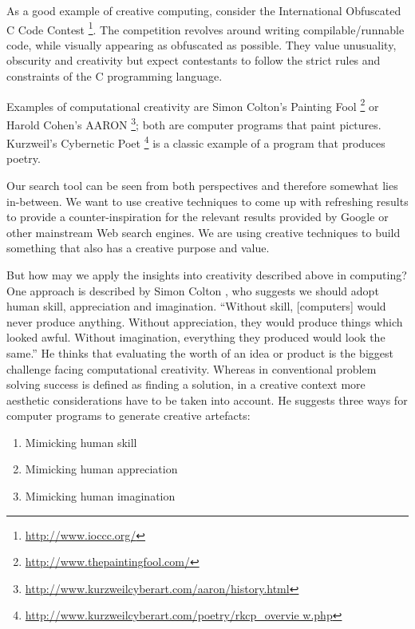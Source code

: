 As a good example of creative computing, consider the International Obfuscated C Code Contest \footnote{\url{http://www.ioccc.org/}}. The competition revolves around writing compilable/runnable code, while visually appearing as obfuscated as possible. They value unusuality, obscurity and creativity but expect contestants to follow the strict rules and constraints of the C programming language.

Examples of computational creativity are Simon Colton's Painting Fool \footnote{\url{http://www.thepaintingfool.com/}} or Harold Cohen's AARON \footnote{\url{http://www.kurzweilcyberart.com/aaron/history.html}}; both are computer programs that paint pictures. Kurzweil's Cybernetic Poet \footnote{\url{http://www.kurzweilcyberart.com/poetry/rkcp_overvie w.php}} is a classic example of a program that produces poetry.

Our search tool can be seen from both perspectives and therefore somewhat lies in-between. We want to use creative techniques to come up with refreshing results to provide a counter-inspiration for the relevant results provided by Google or other mainstream Web search engines. We are using creative techniques to build something that also has a creative purpose and value.

But how may we apply the insights into creativity described above in computing? One approach is described by Simon Colton \citep{Colton2008}, who suggests we should adopt human skill, appreciation and imagination. ``Without skill, [computers] would never produce anything. Without appreciation, they would produce things which looked awful. Without imagination, everything they produced would look the same.'' He thinks that evaluating the worth of an idea or product is the biggest challenge facing computational creativity. Whereas in conventional problem solving success is defined as finding a solution, in a creative context more aesthetic considerations have to be taken into account. He suggests three ways for computer programs to generate creative artefacts:

\begin{enumerate}
  \item Mimicking human skill
  \item Mimicking human appreciation
  \item Mimicking human imagination
\end{enumerate}

